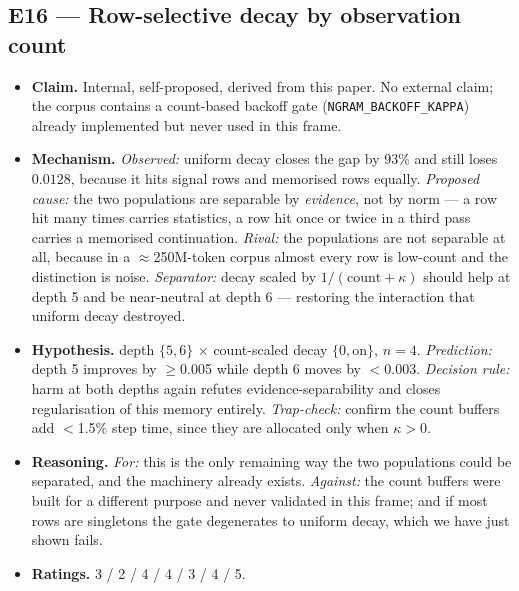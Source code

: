 \documentclass{article}
\begin{document}
\subsection{E16 --- Row-selective decay by observation count}
\begin{itemize}\itemsep2pt
\item \textbf{Claim.} Internal, self-proposed, derived from this paper. No external claim; the corpus contains a count-based backoff gate (\texttt{NGRAM\_BACKOFF\_KAPPA}) already implemented but never used in this frame.
\item \textbf{Mechanism.} \emph{Observed:} uniform decay closes the gap by 93\% and still loses $0.0128$, because it hits signal rows and memorised rows equally. \emph{Proposed cause:} the two populations are separable by \emph{evidence}, not by norm --- a row hit many times carries statistics, a row hit once or twice in a third pass carries a memorised continuation. \emph{Rival:} the populations are not separable at all, because in a $\approx$250M-token corpus almost every row is low-count and the distinction is noise. \emph{Separator:} decay scaled by $1/(\mathrm{count}+\kappa)$ should help at depth 5 and be near-neutral at depth 6 --- restoring the interaction that uniform decay destroyed.
\item \textbf{Hypothesis.} depth $\{5,6\}$ $\times$ count-scaled decay $\{0, \text{on}\}$, $n{=}4$. \emph{Prediction:} depth 5 improves by $\ge$0.005 while depth 6 moves by $<$0.003. \emph{Decision rule:} harm at both depths again refutes evidence-separability and closes regularisation of this memory entirely. \emph{Trap-check:} confirm the count buffers add $<$1.5\% step time, since they are allocated only when $\kappa>0$.
\item \textbf{Reasoning.} \emph{For:} this is the only remaining way the two populations could be separated, and the machinery already exists. \emph{Against:} the count buffers were built for a different purpose and never validated in this frame; and if most rows are singletons the gate degenerates to uniform decay, which we have just shown fails.
\item \textbf{Ratings.} 3 / 2 / 4 / 4 / 3 / 4 / 5.
\end{itemize}
\end{document}
